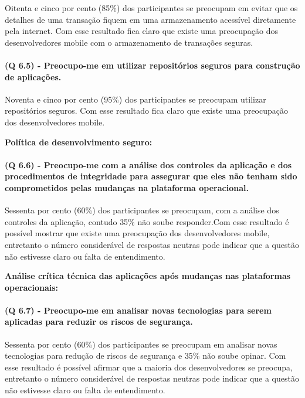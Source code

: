 Oitenta e cinco por cento (85{\%}) dos participantes se preocupam em evitar que os detalhes de uma transação fiquem em uma armazenamento acessível diretamente pela internet. Com esse resultado fica claro que existe uma preocupação dos desenvolvedores mobile com o armazenamento de transações seguras.

\paragraph{\textbf{(Q 6.5)} - Preocupo-me em utilizar repositórios seguros para construção de aplicações.}

Noventa e cinco por cento (95{\%}) dos participantes se preocupam utilizar repositórios seguros. Com esse resultado fica claro que existe uma preocupação dos desenvolvedores mobile.

\vspace{3cm}
\noindent\textbf{Política de desenvolvimento seguro:}
\paragraph{\textbf{(Q 6.6)} - Preocupo-me com a análise dos controles da aplicação e dos procedimentos de integridade para assegurar que eles não tenham sido comprometidos pelas mudanças na plataforma operacional.}

Sessenta por cento (60{\%}) dos participantes se preocupam, com a análise dos controles da aplicação, contudo {35\%} não soube responder.Com esse resultado é possível mostrar que existe uma preocupação dos desenvolvedores mobile, entretanto o número considerável de respostas neutras pode indicar que a questão não estivesse claro ou falta de entendimento.


\vspace{0.5cm}
\noindent\textbf{Análise crítica técnica das aplicações após mudanças nas plataformas operacionais:}
\paragraph{\textbf{(Q 6.7)} - Preocupo-me em analisar novas tecnologias para serem aplicadas para reduzir os riscos de segurança.}

Sessenta por cento (60{\%}) dos participantes se preocupam em analisar novas tecnologias para redução de riscos de segurança e {35\%} não soube opinar. Com esse resultado é possível afirmar que a maioria dos desenvolvedores se preocupa, entretanto o número considerável de respostas neutras pode indicar que a questão não estivesse claro ou falta de entendimento.


